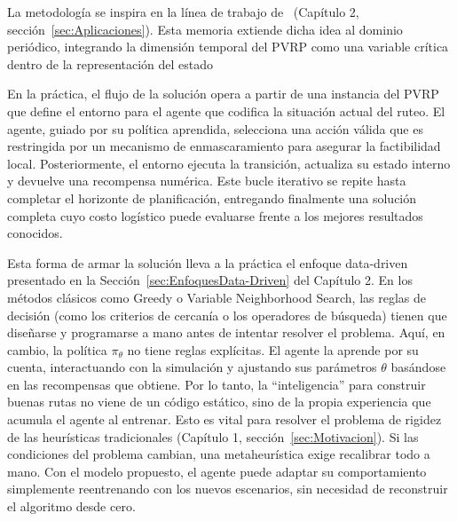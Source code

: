 La metodología se inspira en la línea de trabajo de~\cite{nazari2018reinforcementlearningsolvingvehicle} (Capítulo 2, sección~\ref{sec:Aplicaciones}). Esta memoria extiende dicha idea al dominio periódico, integrando la dimensión temporal del PVRP como una variable crítica dentro de la representación del estado

En la práctica, el flujo de la solución opera a partir de una instancia del PVRP que define el entorno para el agente que codifica la situación actual del ruteo. El agente, guiado por su política aprendida, selecciona una acción válida que es restringida por un mecanismo de enmascaramiento para asegurar la factibilidad local. Posteriormente, el entorno ejecuta la transición, actualiza su estado interno y devuelve una recompensa numérica. Este bucle iterativo se repite hasta completar el horizonte de planificación, entregando finalmente una solución completa cuyo costo logístico puede evaluarse frente a los mejores resultados conocidos.

Esta forma de armar la solución lleva a la práctica el enfoque data-driven presentado en la Sección~\ref{sec:EnfoquesData-Driven} del Capítulo 2. En los métodos clásicos como Greedy o Variable Neighborhood Search, las reglas de decisión (como los criterios de cercanía o los operadores de búsqueda) tienen que diseñarse y programarse a mano antes de intentar resolver el problema. Aquí, en cambio, la política $\pi_\theta$ no tiene reglas explícitas. El agente la aprende por su cuenta, interactuando con la simulación y ajustando sus parámetros $\theta$ basándose en las recompensas que obtiene. Por lo tanto, la \enquote{inteligencia} para construir buenas rutas no viene de un código estático, sino de la propia experiencia que acumula el agente al entrenar. Esto es vital para resolver el problema de rigidez de las heurísticas tradicionales (Capítulo 1, sección~\ref{sec:Motivacion}). Si las condiciones del problema cambian, una metaheurística exige recalibrar todo a mano. Con el modelo propuesto, el agente puede adaptar su comportamiento simplemente reentrenando con los nuevos escenarios, sin necesidad de reconstruir el algoritmo desde cero.

